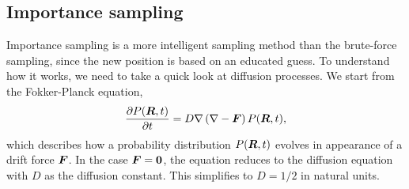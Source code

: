 \subsection{Importance sampling} \label{sec:importancesampling}
Importance sampling is a more intelligent sampling method than the brute-force sampling, since the new position is based on an educated guess. To understand how it works, we need to take a quick look at diffusion processes. We start from the Fokker-Planck equation,
\begin{equation}
\frac{\partial P(\boldsymbol{{R}},t)}{\partial t}=D\nabla\left(\nabla-\boldsymbol{{F}}\right)P(\boldsymbol{{R}},t),
\label{eq:fokkerplanck}
\end{equation}
which describes how a probability distribution $P(\boldsymbol{{R}},t)$ evolves in appearance of a drift force $\boldsymbol{{F}}$. In the case $\boldsymbol{{F}}=\boldsymbol{{0}}$, the equation reduces to the diffusion equation with $D$ as the diffusion constant. This simplifies to $D=1/2$ in natural units. 

